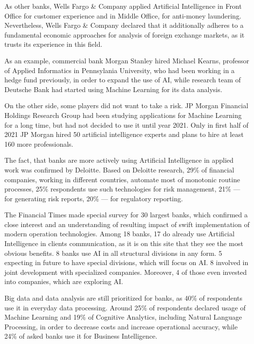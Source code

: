 As other banks, Wells Fargo \& Company applied Artificial Intelligence in Front Office for customer experience and in Middle Office, for anti-money laundering.
Nevertheless, Wells Fargo \& Company declared that it additionally adheres to a fundamental economic approaches for analysis of foreign exchange markets, as it trusts its experience in this field.
\cite{wells_fargo_ai}

As an example, commercial bank Morgan Stanley hired Michael Kearns, professor of Applied Informatics in Pennsylania University, who had been working in a hedge fund previously, in order to expand the use of AI, while research team of Deutsche Bank had started using Machine Learning for its data analysis.

On the other side, some players did not want to take a risk.
JP Morgan Financial Holdings Research Group had been studying applications for Machine Learning for a long time, but had not decided to use it until year 2021.
Only in first half of 2021 JP Morgan hired 50 artificial intelligence experts and plans to hire at least 160 more professionals.
\cite{jp_morgan_ai}

The fact, that banks are more actively using Artificial Intelligence in applied work was confirmed by Deloitte.
Based on Deloitte research, 
29\% of financial companies, working in different countries, automate most of monotonic routine processes,
25\% respondents use such technologies for risk management,
21\% — for generating risk reports, 
20\% — for regulatory reporting.
\cite{deloitte_thriving_in_ai_era}


The Financial Times made special survey for 30 largest banks, which confirmed a close interest and an understanding of resulting impact 
of swift implementation of modern operation technologies.
Among 18 banks, 17 do already use Artificial Intelligence in clients communication, as it is on this site that they see the most obvious benefits.
8 banks use AI in all structural divisions in any form.
5 expecting in future to have special divisions, which will focus on AI.
8 involved in joint development with specialized companies. 
Moreover, 4 of those even invested into companies, which are exploring AI.
\cite{ai_reality_hype}


Big data and data analysis are still prioritized for banks, as 40\% of respondents use it in everyday data processing.
Around 25\% of respondents declared usage of Machine Learning and 19\% of Cognitive Analytics, including Natural Language Processing, in order to decrease costs and increase operational accuracy, while 24\% of asked banks use it for Business Intelligence.



